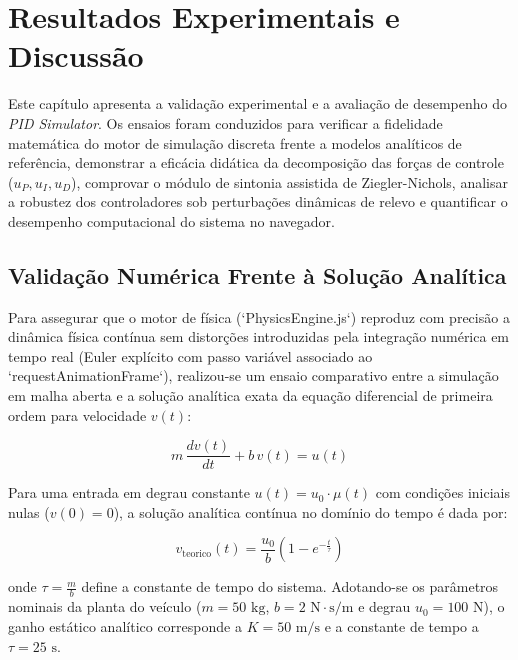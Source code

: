 \chapter{Resultados Experimentais e Discussão}
\label{cap:resultados}

Este capítulo apresenta a validação experimental e a avaliação de desempenho do \textit{PID Simulator}. Os ensaios foram conduzidos para verificar a fidelidade matemática do motor de simulação discreta frente a modelos analíticos de referência, demonstrar a eficácia didática da decomposição das forças de controle ($u_P, u_I, u_D$), comprovar o módulo de sintonia assistida de Ziegler-Nichols, analisar a robustez dos controladores sob perturbações dinâmicas de relevo e quantificar o desempenho computacional do sistema no navegador.

\section{Validação Numérica Frente à Solução Analítica}
\label{sec:validacao_analitica}

Para assegurar que o motor de física (`PhysicsEngine.js`) reproduz com precisão a dinâmica física contínua sem distorções introduzidas pela integração numérica em tempo real (Euler explícito com passo variável associado ao `requestAnimationFrame`), realizou-se um ensaio comparativo entre a simulação em malha aberta e a solução analítica exata da equação diferencial de primeira ordem para velocidade $v(t)$:

\begin{equation}
    m \, \frac{dv(t)}{dt} + b \, v(t) = u(t)
    \label{eq:ensaio_validacao}
\end{equation}

Para uma entrada em degrau constante $u(t) = u_0 \cdot \mu(t)$ com condições iniciais nulas ($v(0) = 0$), a solução analítica contínua no domínio do tempo é dada por:

\begin{equation}
    v_{\text{teorico}}(t) = \frac{u_0}{b} \left( 1 - e^{-\frac{t}{\tau}} \right)
    \label{eq:solucao_analitica_v}
\end{equation}

\noindent onde $\tau = \frac{m}{b}$ define a constante de tempo do sistema. Adotando-se os parâmetros nominais da planta do veículo ($m = 50\text{ kg}$, $b = 2\text{ N}\cdot\text{s/m}$ e degrau $u_0 = 100\text{ N}$), o ganho estático analítico corresponde a $K = 50\text{ m/s}$ e a constante de tempo a $\tau = 25\text{ s}$.

